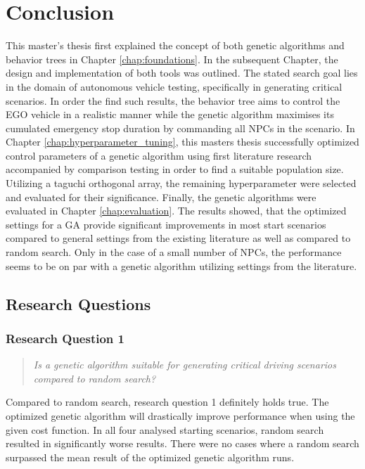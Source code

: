 \chapter{Conclusion}
This master's thesis first explained the concept of both genetic algorithms and behavior trees in Chapter \ref{chap:foundations}. In the subsequent Chapter, the design and implementation of both tools was outlined. The stated search goal lies in the domain of autonomous vehicle testing, specifically in generating critical scenarios. In order the find such results, the behavior tree aims to control the EGO vehicle in a realistic manner while the genetic algorithm maximises its cumulated emergency stop duration by commanding all NPCs in the scenario. In Chapter \ref{chap:hyperparameter_tuning}, this masters thesis successfully optimized control parameters of a genetic algorithm using first literature research accompanied by comparison testing in order to find a suitable population size. Utilizing a taguchi orthogonal array, the remaining hyperparameter were selected and evaluated for their significance. Finally, the genetic algorithms were evaluated in Chapter \ref{chap:evaluation}. The results showed, that the optimized settings for a GA provide significant improvements in most start scenarios compared to general settings from the existing literature as well as compared to random search. Only in the case of a small number of NPCs, the performance seems to be on par with a genetic algorithm utilizing settings from the literature.

\section{Research Questions}
\subsection{Research Question 1}
\begin{quote}
	\begin{em}
		\textit{Is a genetic algorithm suitable for generating critical driving scenarios compared to random search?}
	\end{em}
\end{quote}

Compared to random search, research question 1 definitely holds true. The optimized genetic algorithm will drastically improve performance when using the given cost function. In all four analysed starting scenarios, random search resulted in significantly worse results. There were no cases where a random search surpassed the mean result of the optimized genetic algorithm runs.

